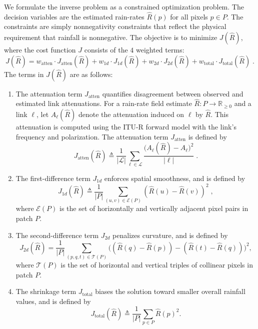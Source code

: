 \documentclass[a4paper,fleqn]{cas-sc}
\begin{document}
We formulate the inverse problem as a constrained optimization problem. The decision variables are the estimated rain-rates \(\hat{R}(p)\) for all pixels \(p \in P\). The constraints are simply nonnegativity constraints that reflect the physical requirement that rainfall is nonnegative. The objective is to minimize $J(\hat{R})$, where the cost function $J$ consists of the $4$ weighted terms:
\[
  J(\hat{R}) =
  w_{\mathrm{atten}} \cdot J_{\mathrm{atten}}(\hat{R})
  +
  w_{1d} \cdot J_{1d}(\hat{R})
  +
  w_{2d} \cdot J_{2d}(\hat{R})
  +
  w_{\mathrm{total}} \cdot J_{\mathrm{total}}(\hat{R})\;.
\]
The terms in $J(\hat{R})$ are as follows:
\begin{enumerate}
  \item The attenuation term $J_{\mathrm{atten}}$ quantifies disagreement between observed and estimated link attenuations.
        For a rain-rate field estimate $\hat{R}:P \rightarrow \mathbb{R}_{\geq 0}$ and a link $\ell$, let $A_{\ell}(\hat{R})$ denote the attenuation induced on $\ell$ by $\hat{R}$.
        This attenuation is computed using the ITU-R forward model with the link's frequency and polarization.
        The attenuation term $J_{\mathrm{atten}}$ is defined by
        \[
          J_{\mathrm{atten}}(\hat{R}) \triangleq
          \frac{1}{|\mathcal{L}|}
          \sum_{\ell \in \mathcal{L}}
          \frac{\bigl( A_\ell(\hat{R}) - A_\ell \bigr)^2}{|\ell|}\;.
        \]
  \item
        The first-difference term $J_{1d}$ enforces spatial smoothness, and is defined by
        \[
          J_{1d}(\hat{R}) \triangleq
          \frac{1}{|P|}
          \sum_{(u,v)\in\mathcal{E}(P)} (\hat{R}(u) - \hat{R}(v))^2\;,
        \]
        where $\mathcal{E}(P)$ is the set of horizontally and vertically adjacent pixel pairs in patch $P$.
  \item
        The second-difference term $J_{2d}$ penalizes curvature, and is defined by
        \[
          J_{2d}(\hat{R}) =
          \frac{1}{|P|}
          \sum_{(p,q,t)\in\mathcal{T}(P)} \bigl((\hat{R}(q) - \hat{R}(p)) - (\hat{R}(t) - \hat{R}(q))\bigr)^2,
        \]
        where $\mathcal{T}(P)$ is the set of horizontal and vertical triples of collinear pixels in patch $P$.
  \item
        The shrinkage term $J_{\mathrm{total}}$ biases the solution toward smaller overall rainfall values, and is defined by
        \[
          J_{\mathrm{total}}(\hat{R}) \triangleq
          \frac{1}{|P|}
          \sum_{p \in P} \hat{R}(p)^2.
        \]
\end{enumerate}
\end{document}
